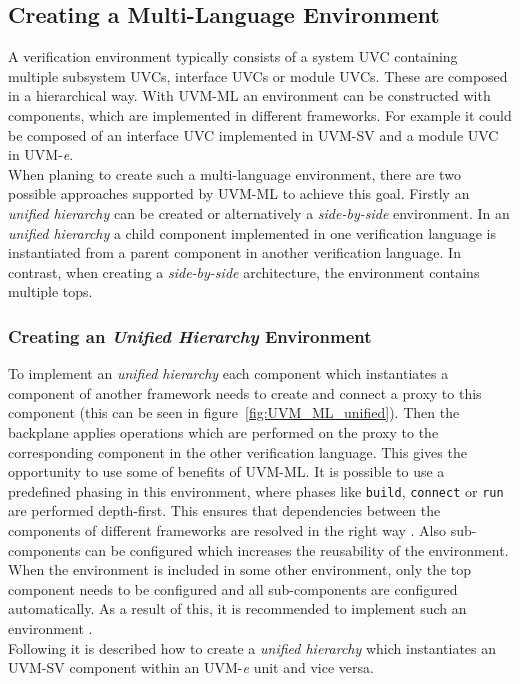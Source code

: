 \subsection{Creating a Multi-Language Environment}
A verification environment typically consists of a system UVC containing
multiple subsystem UVCs, interface UVCs or module UVCs. These are composed in a
hierarchical way. With UVM-ML an environment can be constructed with components,
which are implemented in different frameworks. For example it could be composed
of an interface UVC implemented in UVM-SV and a module UVC in
UVM-\textit{e}. \\
When planing to create such a multi-language environment, there
are two possible approaches supported by UVM-ML to achieve this goal. Firstly an
\emph{unified hierarchy} can be created or alternatively a \emph{side-by-side}
environment. In an \emph{unified hierarchy} a child component implemented in one
verification language is instantiated from a parent component in another
verification language. In contrast, when creating a \emph{side-by-side} architecture,
the environment contains multiple tops.

\subsubsection{Creating an \emph{Unified Hierarchy} Environment}
To implement an \emph{unified hierarchy} each component which instantiates a
component of another framework needs to create and connect a proxy to
this component (this can be seen in figure~\ref{fig:UVM_ML_unified}). Then the
backplane applies operations which are performed on the proxy to the
corresponding component in the other verification language. This gives the
opportunity to use some of benefits of UVM-ML. It is possible to use a predefined
phasing in this environment, where phases like \lstinline$build$, \lstinline$connect$ or \lstinline$run$ are
performed depth-first. This ensures that dependencies between the components of
different frameworks are resolved in the right way \cite{uvm_ml_ref}. Also sub-components can be
configured which increases the reusability of the environment. When the
environment is included in some other environment, only the top component needs
to be configured and all sub-components are configured automatically. As a result of
this, it is recommended to implement such an environment \cite{uvm_ml_user}.\\
Following it is described how to create a \emph{unified hierarchy} which
instantiates an UVM-SV component within an UVM-\textit{e} unit and vice versa.

